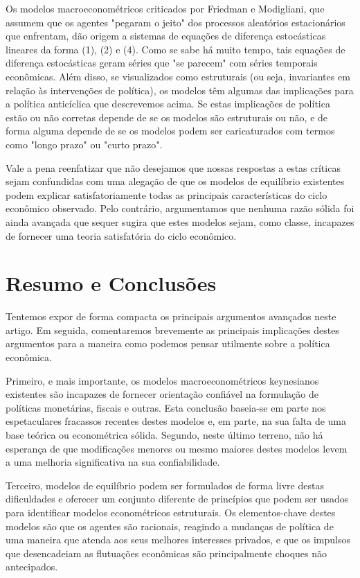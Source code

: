 \documentclass[12pt]{article}
\begin{document}
Os modelos macroeconométricos criticados por Friedman e Modigliani, que assumem que os agentes "pegaram o jeito" dos processos aleatórios estacionários que enfrentam, dão origem a sistemas de equações de diferença estocásticas lineares da forma (1), (2) e (4). Como se sabe há muito tempo, tais equações de diferença estocásticas geram séries que "se parecem" com séries temporais econômicas. Além disso, se visualizados como estruturais (ou seja, invariantes em relação às intervenções de política), os modelos têm algumas das implicações para a política anticíclica que descrevemos acima. Se estas implicações de política estão ou não corretas depende de se os modelos são estruturais ou não, e de forma alguma depende de se os modelos podem ser caricaturados com termos como "longo prazo" ou "curto prazo".

Vale a pena reenfatizar que não desejamos que nossas respostas a estas críticas sejam confundidas com uma alegação de que os modelos de equilíbrio existentes podem explicar satisfatoriamente todas as principais características do ciclo econômico observado. Pelo contrário, argumentamos que nenhuma razão sólida foi ainda avançada que sequer sugira que estes modelos sejam, como classe, incapazes de fornecer uma teoria satisfatória do ciclo econômico.

\section{Resumo e Conclusões}

Tentemos expor de forma compacta os principais argumentos avançados neste artigo. Em seguida, comentaremos brevemente as principais implicações destes argumentos para a maneira como podemos pensar utilmente sobre a política econômica.

Primeiro, e mais importante, os modelos macroeconométricos keynesianos existentes são incapazes de fornecer orientação confiável na formulação de políticas monetárias, fiscais e outras. Esta conclusão baseia-se em parte nos espetaculares fracassos recentes destes modelos e, em parte, na sua falta de uma base teórica ou econométrica sólida. Segundo, neste último terreno, não há esperança de que modificações menores ou mesmo maiores destes modelos levem a uma melhoria significativa na sua confiabilidade.

Terceiro, modelos de equilíbrio podem ser formulados de forma livre destas dificuldades e oferecer um conjunto diferente de princípios que podem ser usados para identificar modelos econométricos estruturais. Os elementos-chave destes modelos são que os agentes são racionais, reagindo a mudanças de política de uma maneira que atenda aos seus melhores interesses privados, e que os impulsos que desencadeiam as flutuações econômicas são principalmente choques não antecipados.
\end{document}
